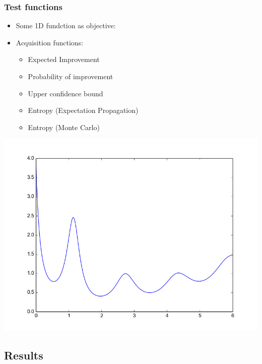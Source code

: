 \documentclass[10pt,handout]{beamer}
\begin{document}




\begin{frame}
\frametitle{Test functions}
\begin{minipage}{0.55\textwidth}
\begin{itemize}
\item Some 1D fundction as objective:
\item Acquisition functions:
\begin{itemize}
\item Expected Improvement
\item Probability of improvement
\item Upper confidence bound
\item Entropy (Expectation Propagation)
\item Entropy (Monte Carlo)
\end{itemize}
\end{itemize}  
\end{minipage}%
\begin{minipage}{0.43\textwidth}
\includegraphics[width=\textwidth]{self_constructed_oned.png}
\end{minipage}
\end{frame}


\subsection{Results}
\end{document}
